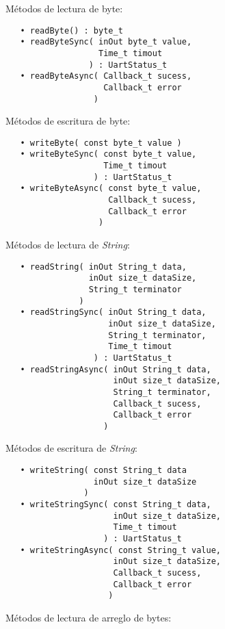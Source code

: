 
Métodos de lectura de byte:

\begin{verbatim}
   • readByte() : byte_t
   • readByteSync( inOut byte_t value, 
                   Time_t timout
                 ) : UartStatus_t
   • readByteAsync( Callback_t sucess, 
                    Callback_t error 
                  )
\end{verbatim}

Métodos de escritura de byte:

\begin{verbatim}
   • writeByte( const byte_t value )
   • writeByteSync( const byte_t value, 
                    Time_t timout 
                  ) : UartStatus_t
   • writeByteAsync( const byte_t value, 
                     Callback_t sucess,
                     Callback_t error 
                   )
\end{verbatim}

Métodos de lectura de \emph{String}:

\begin{verbatim}
   • readString( inOut String_t data,
                 inOut size_t dataSize,
                 String_t terminator
               )
   • readStringSync( inOut String_t data,
                     inOut size_t dataSize,
                     String_t terminator,
                     Time_t timout 
                  ) : UartStatus_t
   • readStringAsync( inOut String_t data,
                      inOut size_t dataSize,
   	                  String_t terminator,
                      Callback_t sucess, 
                      Callback_t error 
                    ) 
\end{verbatim}

Métodos de escritura de \emph{String}:                  
                
\begin{verbatim}  
   • writeString( const String_t data
                  inOut size_t dataSize
                )
   • writeStringSync( const String_t data,
                      inOut size_t dataSize,
                      Time_t timout
                    ) : UartStatus_t
   • writeStringAsync( const String_t value, 
                      inOut size_t dataSize,
                      Callback_t sucess,
                      Callback_t error
                     )
\end{verbatim}

Métodos de lectura de arreglo de bytes:

